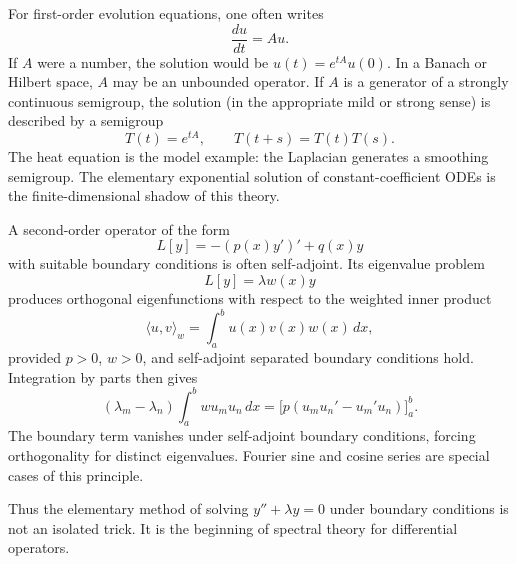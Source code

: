For first-order evolution equations, one often writes
\[
  \frac{du}{dt}=Au.
\]
If $A$ were a number, the solution would be $u(t)=e^{tA}u(0)$.  In a Banach or Hilbert space, $A$ may be an unbounded operator. If $A$ is a generator of a strongly continuous semigroup, the solution (in the appropriate mild or strong sense) is described by a semigroup
\[
  T(t)=e^{tA},\qquad T(t+s)=T(t)T(s).
\]
The heat equation is the model example: the Laplacian generates a smoothing semigroup.  The elementary exponential solution of constant-coefficient ODEs is the finite-dimensional shadow of this theory.

A second-order operator of the form
\[
  L[y]=-(p(x)y')'+q(x)y
\]
with suitable boundary conditions is often self-adjoint.  Its eigenvalue problem
\[
  L[y]=\lambda w(x)y
\]
produces orthogonal eigenfunctions with respect to the weighted inner product
\[
 \langle u,v\rangle_w=\int_a^b u(x)v(x)w(x)\,dx,
\]
provided \(p>0\), \(w>0\), and self-adjoint separated boundary conditions hold. Integration by parts then gives
\[
 (\lambda_m-\lambda_n)\int_a^b w u_m u_n\,dx
 =\bigl[p(u_m u_n'-u_m'u_n)\bigr]_a^b.
\]
The boundary term vanishes under self-adjoint boundary conditions, forcing orthogonality for distinct eigenvalues. Fourier sine and cosine series are special cases of this principle.

Thus the elementary method of solving $y''+\lambda y=0$ under boundary conditions is not an isolated trick.  It is the beginning of spectral theory for differential operators.
